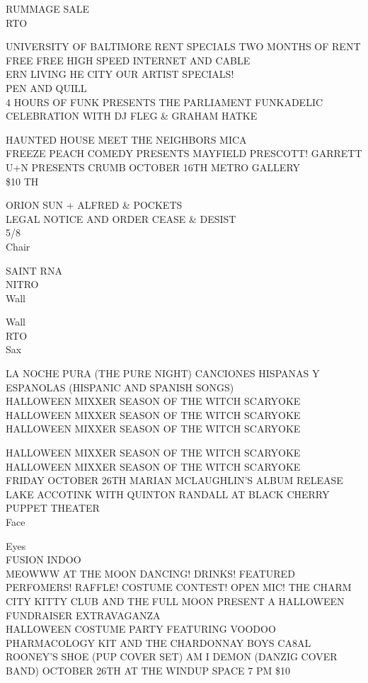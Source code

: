 \documentclass[10pt,letterpaper]{article}
\begin{document}
RUMMAGE SALE\\
RTO

UNIVERSITY OF BALTIMORE RENT SPECIALS TWO MONTHS OF RENT FREE FREE HIGH SPEED INTERNET AND CABLE\\
ERN LIVING HE CITY OUR ARTIST SPECIALS!\\
PEN AND QUILL\\
4 HOURS OF FUNK PRESENTS THE PARLIAMENT FUNKADELIC CELEBRATION WITH DJ FLEG \& GRAHAM HATKE

HAUNTED HOUSE MEET THE NEIGHBORS MICA\\
FREEZE PEACH COMEDY PRESENTS MAYFIELD PRESCOTT!  GARRETT\\
U+N PRESENTS CRUMB OCTOBER 16TH METRO GALLERY\\
\$10 TH

ORION SUN + ALFRED \& POCKETS\\
LEGAL NOTICE AND ORDER CEASE \& DESIST\\
5/8\\
Chair

SAINT RNA\\
NITRO\\
Wall

Wall\\
RTO\\
Sax

LA NOCHE PURA (THE PURE NIGHT) CANCIONES HISPANAS Y ESPANOLAS (HISPANIC AND SPANISH SONGS)\\
HALLOWEEN MIXXER SEASON OF THE WITCH SCARYOKE\\
HALLOWEEN MIXXER SEASON OF THE WITCH SCARYOKE\\
HALLOWEEN MIXXER SEASON OF THE WITCH SCARYOKE

HALLOWEEN MIXXER SEASON OF THE WITCH SCARYOKE\\
HALLOWEEN MIXXER SEASON OF THE WITCH SCARYOKE\\
FRIDAY OCTOBER 26TH MARIAN MCLAUGHLIN'S ALBUM RELEASE LAKE ACCOTINK WITH QUINTON RANDALL AT BLACK CHERRY PUPPET THEATER\\
Face

Eyes\\
FUSION INDOO\\
MEOWWW AT THE MOON DANCING!  DRINKS!  FEATURED PERFOMERS!  RAFFLE!  COSTUME CONTEST!  OPEN MIC!  THE CHARM CITY KITTY CLUB AND THE FULL MOON PRESENT A HALLOWEEN FUNDRAISER EXTRAVAGANZA\\
HALLOWEEN COSTUME PARTY FEATURING VOODOO PHARMACOLOGY KIT AND THE CHARDONNAY BOYS CA8AL ROONEY'S SHOE (PUP COVER SET) AM I DEMON (DANZIG COVER BAND) OCTOBER 26TH AT THE WINDUP SPACE 7 PM \$10
\end{document}
